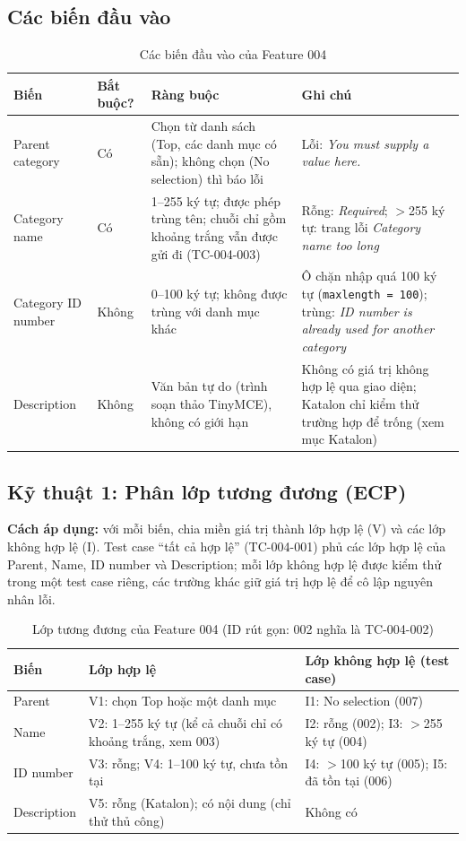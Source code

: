 \documentclass[12pt,a4paper]{article}
\begin{document}
\subsection{Các biến đầu vào}
\begin{table}[H]
\centering\small
\begin{tabular}{|L{2.6cm}|L{2.0cm}|L{5.2cm}|L{5.2cm}|}
\hline
{}\textbf{Biến} & \textbf{Bắt buộc?} & \textbf{Ràng buộc} & \textbf{Ghi chú} \\ \hline
Parent category & Có & Chọn từ danh sách (Top, các danh mục có sẵn); không chọn (No selection) thì báo lỗi & Lỗi: \textit{You must supply a value here.} \\ \hline
Category name & Có & 1--255 ký tự; được phép trùng tên; chuỗi chỉ gồm khoảng trắng vẫn được gửi đi (TC-004-003) & Rỗng: \textit{Required}; $>$255 ký tự: trang lỗi \textit{Category name too long} \\ \hline
Category ID number & Không & 0--100 ký tự; không được trùng với danh mục khác & Ô chặn nhập quá 100 ký tự (\texttt{maxlength = 100}); trùng: \textit{ID number is already used for another category} \\ \hline
Description & Không & Văn bản tự do (trình soạn thảo TinyMCE), không có giới hạn & Không có giá trị không hợp lệ qua giao diện; Katalon chỉ kiểm thử trường hợp để trống (xem mục Katalon) \\ \hline
\end{tabular}
\caption{Các biến đầu vào của Feature 004}
\end{table}

\subsection{Kỹ thuật 1: Phân lớp tương đương (ECP)}
\textbf{Cách áp dụng:} với mỗi biến, chia miền giá trị thành lớp hợp lệ (V) và các lớp không hợp lệ (I).
Test case ``tất cả hợp lệ'' (TC-004-001) phủ các lớp hợp lệ của Parent, Name, ID number và Description; mỗi lớp không hợp lệ được kiểm thử
trong một test case riêng, các trường khác giữ giá trị hợp lệ để cô lập nguyên nhân lỗi.

\begin{table}[H]
\centering\footnotesize
\begin{tabular}{|l|L{5.4cm}|L{7.0cm}|}
\hline
{}\textbf{Biến} & \textbf{Lớp hợp lệ} & \textbf{Lớp không hợp lệ (test case)} \\ \hline
Parent & V1: chọn Top hoặc một danh mục & I1: No selection (007) \\ \hline
Name & V2: 1--255 ký tự (kể cả chuỗi chỉ có khoảng trắng, xem 003) & I2: rỗng (002); I3: $>$255 ký tự (004) \\ \hline
ID number & V3: rỗng; V4: 1--100 ký tự, chưa tồn tại & I4: $>$100 ký tự (005); I5: đã tồn tại (006) \\ \hline
Description & V5: rỗng (Katalon); có nội dung (chỉ thử thủ công) & Không có \\ \hline
\end{tabular}
\caption{Lớp tương đương của Feature 004 (ID rút gọn: 002 nghĩa là TC-004-002)}
\end{table}
\end{document}
